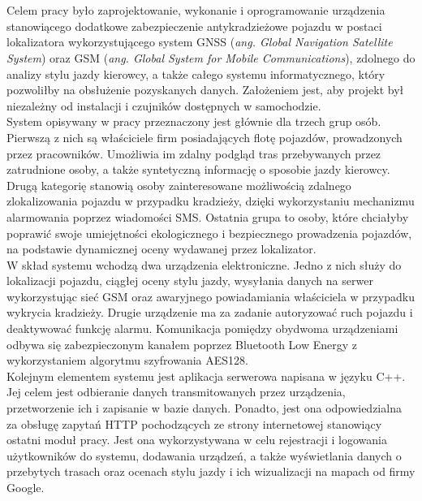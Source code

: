 \thispagestyle{empty}
\\

\\

\begin{singlespacing}

Celem pracy było zaprojektowanie, wykonanie i oprogramowanie urządzenia stanowiącego dodatkowe zabezpieczenie antykradzieżowe pojazdu w postaci lokalizatora wykorzystującego system GNSS (\textit{ang. Global Navigation Satellite System}) oraz GSM (\textit{ang. Global System for Mobile Communications}), zdolnego do analizy stylu jazdy kierowcy, a także całego systemu informatycznego, który pozwoliłby na obsłużenie pozyskanych danych. Założeniem jest, aby projekt był niezależny od instalacji i czujników dostępnych w samochodzie.\\

System opisywany w pracy przeznaczony jest głównie dla trzech grup osób. Pierwszą z nich są właściciele firm posiadających flotę pojazdów, prowadzonych przez pracowników. Umożliwia im zdalny podgląd tras przebywanych przez zatrudnione osoby, a także syntetyczną informację o sposobie jazdy kierowcy. Drugą kategorię stanowią osoby zainteresowane możliwością zdalnego zlokalizowania pojazdu w przypadku kradzieży, dzięki wykorzystaniu mechanizmu alarmowania poprzez wiadomości SMS. Ostatnia grupa to osoby, które chciałyby poprawić swoje umiejętności ekologicznego i bezpiecznego prowadzenia pojazdów, na podstawie dynamicznej oceny wydawanej przez lokalizator. \\

W skład systemu wchodzą dwa urządzenia elektroniczne. Jedno z nich służy do lokalizacji pojazdu, ciągłej oceny stylu jazdy, wysyłania danych na serwer wykorzystując sieć GSM oraz awaryjnego powiadamiania właściciela w przypadku wykrycia kradzieży. Drugie urządzenie ma za zadanie autoryzować ruch pojazdu i deaktywować funkcję alarmu. Komunikacja pomiędzy obydwoma urządzeniami odbywa się zabezpieczonym kanałem poprzez Bluetooth Low Energy z wykorzystaniem algorytmu szyfrowania AES128. \\

Kolejnym elementem systemu jest aplikacja serwerowa napisana w języku C++. Jej celem jest odbieranie danych transmitowanych przez urządzenia, przetworzenie ich i zapisanie w bazie danych. Ponadto, jest ona odpowiedzialna za obsługę zapytań HTTP pochodzących ze strony internetowej stanowiący ostatni moduł pracy. Jest ona wykorzystywana w celu rejestracji i logowania użytkowników do systemu, dodawania urządzeń, a także wyświetlania danych o przebytych trasach oraz ocenach stylu jazdy i ich wizualizacji na mapach od firmy Google. \\


\end{singlespacing}
